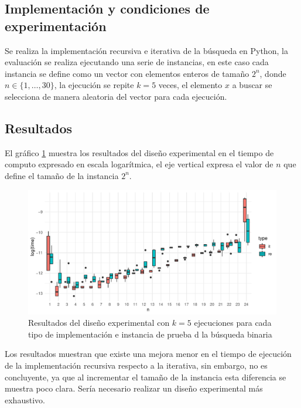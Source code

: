 \documentclass[letterpaper,11pt]{article}
\begin{document}
\subsection{Implementación y condiciones de experimentación}
Se realiza la implementación recursiva e iterativa de la búsqueda en Python, la evaluación se realiza ejecutando una serie de instancias, en este caso cada instancia se define como un vector con elementos enteros de tamaño ${2^n}$, donde $n\in \{1,\dots,30\}$, la ejecución se repite $k=5$ veces, el elemento $x$ a buscar se selecciona de manera aleatoria del vector para cada ejecución.

\subsection{Resultados}
El gráfico \ref{fig:bs} muestra los resultados del diseño experimental en el tiempo de computo expresado en escala logarítmica, el eje vertical expresa el valor de $n$ que define el tamaño de la instancia ${2^n}$.

\begin{figure}[h!]
  \includegraphics[width=\linewidth]{bs.pdf}
  \caption{Resultados del diseño experimental con $k=5$ ejecuciones para cada tipo de implementación e instancia de prueba d la búsqueda binaria}
  \label{fig:bs}
\end{figure}


Los resultados muestran que existe una mejora menor en el tiempo de ejecución de la implementación recursiva respecto a la iterativa, sin embargo, no es concluyente, ya que al incrementar el tamaño de la instancia esta diferencia se muestra poco clara. Sería necesario realizar un diseño experimental más exhaustivo.
\end{document}
